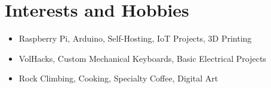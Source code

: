 \documentclass[a4paper,11pt]{article}
\begin{document}

\section{Interests and Hobbies}
\begin{itemize}[topsep=1pt,itemsep=0pt,partopsep=1pt, parsep=1pt]
   \item Raspberry Pi, Arduino, Self-Hosting, IoT Projects, 3D Printing
   \item VolHacks, Custom Mechanical Keyboards, Basic Electrical Projects
   \item Rock Climbing, Cooking, Specialty Coffee, Digital Art
\end{itemize}
\end{document}
